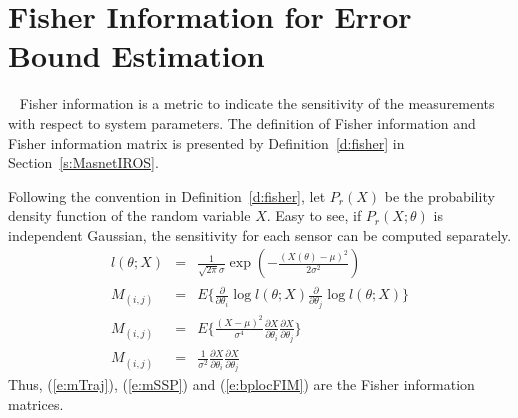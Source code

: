 \chapter{Fisher Information for Error Bound Estimation}~\label{s:fi}
Fisher information is a metric to indicate the sensitivity of the measurements with respect to system parameters. The definition of Fisher information and Fisher information matrix is presented by Definition~\ref{d:fisher} in Section~\ref{s:MasnetIROS}.

Following the convention in Definition~\ref{d:fisher}, let $P_r(X)$ be the probability density function of the random variable $X$.
Easy to see, if $P_r(X;\theta)$ is independent Gaussian, the sensitivity for each sensor can be computed separately.
\begin{eqnarray*}
  l(\theta;X) &=& \frac{1}{\sqrt{2\pi}\sigma} \exp(-\frac{(X(\theta)-\mu)^2}{2\sigma^2})\\
  M_{(i,j)} &=& E\{\frac{\partial}{\partial \theta_i} \log l(\theta;X) \frac{\partial}{\partial \theta_j} \log l(\theta;X) \} \\
  M_{(i,j)} &=& E\{\frac{(X-\mu)^2}{\sigma^4}\frac{\partial X}{\partial \theta_i}\frac{\partial X}{\partial \theta_j} \} \\
  M_{(i,j)} &=& \frac{1}{\sigma^2} \frac{\partial X}{\partial \theta_i}\frac{\partial X}{\partial \theta_j}
\end{eqnarray*}
Thus, (\ref{e:mTraj}), (\ref{e:mSSP}) and (\ref{e:bplocFIM}) are the Fisher information matrices.

